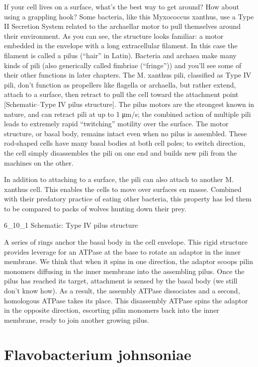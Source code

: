 \documentclass[]{tufte-book}
\begin{document}
If your cell lives on a surface, what's the best way to get around? How
about using a grappling hook? Some bacteria, like this Myxococcus
xanthus, use a Type II Secretion System related to the archaellar motor
to pull themselves around their environment. As you can see, the
structure looks familiar: a motor embedded in the envelope with a long
extracellular filament. In this case the filament is called a pilus
(``hair'' in Latin). Bacteria and archaea make many kinds of pili (also
generically called fimbriae (``fringe'')) and you'll see some of their
other functions in later chapters. The M. xanthus pili, classified as
Type IV pili, don't function as propellers like flagella or archaella,
but rather extend, attach to a surface, then retract to pull the cell
toward the attachment point {[}Schematic--Type IV pilus structure{]}.
The pilus motors are the strongest known in nature, and can retract pili
at up to 1 μm/s; the combined action of multiple pili leads to extremely
rapid ``twitching'' motility over the surface. The motor structure, or
basal body, remains intact even when no pilus is assembled. These
rod-shaped cells have many basal bodies at both cell poles; to switch
direction, the cell simply disassembles the pili on one end and builds
new pili from the machines on the other.

In addition to attaching to a surface, the pili can also attach to
another M. xanthus cell. This enables the cells to move over surfaces en
masse. Combined with their predatory practice of eating other bacteria,
this property has led them to be compared to packs of wolves hunting
down their prey.

6\_10\_1 Schematic: Type IV pilus structure

A series of rings anchor the basal body in the cell envelope. This rigid
structure provides leverage for an ATPase at the base to rotate an
adaptor in the inner membrane. We think that when it spins in one
direction, the adaptor scoops pilin monomers diffusing in the inner
membrane into the assembling pilus. Once the pilus has reached its
target, attachment is sensed by the basal body (we still don't know
how). As a result, the assembly ATPase dissociates and a second,
homologous ATPase takes its place. This disassembly ATPase spins the
adaptor in the opposite direction, escorting pilin monomers back into
the inner membrane, ready to join another growing pilus.

\section{Flavobacterium johnsoniae}\label{flavobacterium-johnsoniae}
\end{document}
